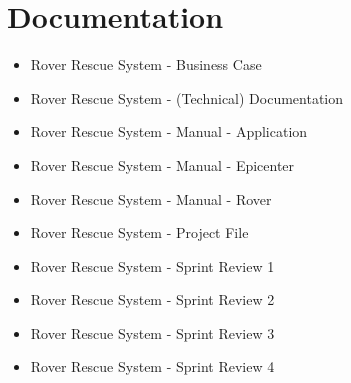 \section{Documentation}

\begin{frame}{\secname}
	\begin{itemize}
		\item Rover Rescue System - Business Case
		\item Rover Rescue System - (Technical) Documentation
		\item Rover Rescue System - Manual - Application
		\item Rover Rescue System - Manual - Epicenter
		\item Rover Rescue System - Manual - Rover
		\item Rover Rescue System - Project File
	 	\item Rover Rescue System - Sprint Review 1
	 	\item Rover Rescue System - Sprint Review 2
	 	\item Rover Rescue System - Sprint Review 3
	 	\item Rover Rescue System - Sprint Review 4
 	\end{itemize}
\end{frame}

